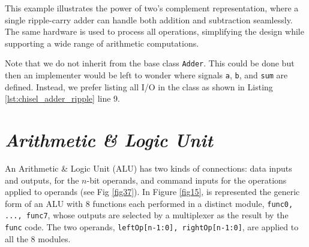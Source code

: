 {This example illustrates the power of two's complement representation, where a single ripple-carry adder can handle both addition and subtraction seamlessly. The same hardware is used to process all operations, simplifying the design while supporting a wide range of arithmetic computations.


Note that we do not inherit from the base class \texttt{Adder}. This could be done but then an implementer would be left to wonder where signals \texttt{a}, \texttt{b}, and \texttt{sum} are defined.  Instead, we prefer listing all I/O in the class as shown in Listing \ref{lst:chisel_adder_ripple} line 9.

}%




\section{{\bf {\em Arithmetic \& Logic Unit}}}\label{alu1}

An Arithmetic \& Logic Unit (ALU) has two kinds of connections: data inputs and outputs, for the $n$-bit operands, and command inputs for the operations applied to operands (see Fig \ref{fig37}). In Figure \ref{fig15}, is represented the generic form of an ALU with 8 functions each performed in a distinct module, {\tt func0, ..., func7}, whose outputs are selected by a multiplexer as the result by the {\tt func} code. The two operands, {\tt leftOp[n-1:0], rightOp[n-1:0]}, are applied to all the 8 modules.






